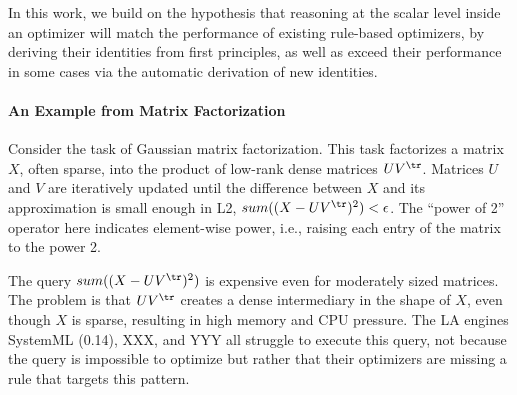 In this work, we build on the hypothesis that reasoning at the scalar level inside an optimizer will match the performance of existing rule-based optimizers, by deriving their identities from first principles, as well as exceed their performance in some cases via the automatic derivation of new identities.


\paragraph{An Example from Matrix Factorization}
Consider the task of Gaussian matrix factorization.  
This task factorizes a matrix $X$, often sparse, into the product of low-rank dense matrices $UV^\tr$. 
Matrices $U$ and $V$ are iteratively updated until the difference between $X$ and its approximation is small enough in L2, $sum((X - UV^\tr)^2) < \epsilon$.  The ``power of 2'' operator here indicates element-wise power, i.e., raising each entry of the matrix to the power 2.

The query $sum((X - UV^\tr)^2)$ is expensive even for moderately sized matrices. 
The problem is that $UV^\tr$ creates a dense intermediary in the shape of $X$, even though $X$ is sparse, resulting in high memory and CPU pressure.
The LA engines SystemML (0.14), XXX, and YYY all struggle to execute this query, not because the query is impossible to optimize but rather that their optimizers are missing a rule that targets this pattern.

